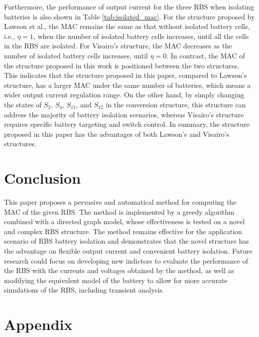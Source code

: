 \documentclass{article}
\begin{document}
Furthermore, the performance of output current for the three RBS when isolating batteries is also shown in Table \ref{tab:isolated_mac}. 
For the structure proposed by Lawson et al., the MAC remains the same as that without isolated battery cells, i.e., $\eta=1$, when the number of isolated battery cells increases, until all the cells in the RBS are isolated. 
For Visairo's structure, the MAC decreases as the number of isolated battery cells increases, until $\eta=0$. 
In contrast, the MAC of the structure proposed in this work is positioned between the two structures. 
This indicates that the structure proposed in this paper, compared to Lawson's structure, has a larger MAC under the same number of batteries, which means a wider output current regulation range. 
On the other hand, by simply changing the states of $S_2$, $S_4$, $S_{11}$, and $S_{12}$ in the conversion structure, this structure can address the majority of battery isolation scenarios, whereas Visairo's structure requires specific battery targeting and switch control. 
In summary, the structure proposed in this paper has the advantages of both Lawson's and Visairo's structures.

\section{Conclusion}

This paper proposes a pervasive and automatical method for computing the MAC of the given RBS.
The method is  implemented by a greedy algorithm combined with a directed graph model, whose effectiveness is tested on a novel and complex RBS structure.
The method remains effective for the application scenario of RBS battery isolation and demonstrates that the novel structure has the advantage on flexible output current and convenient battery isolation.
Future research could focus on developing new indictors to evaluate the performance of the RBS with the currents and voltages obtained by the method, as well as modifying the equivalent model of the battery to allow for more accurate simulations of the RBS, including transient analysis.

\section{Appendix} 
\end{document}
